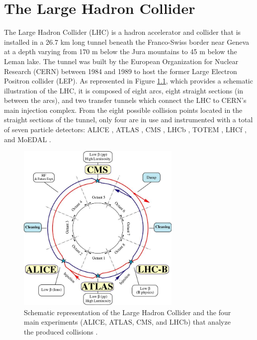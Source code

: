 \chapter{The Large Hadron Collider}
\label{chap:I-2-lhc}

	The Large Hadron Collider (LHC) \cite{Evans:2008zzb} is a hadron accelerator and collider that is installed in a 26.7 km long tunnel beneath the Franco-Swiss border near Geneva at a depth varying from 170 m below the Jura mountains to 45 m below the Leman lake. The tunnel was built by the European Organization for Nuclear Research (CERN) between 1984 and 1989 to host the former Large Electron Positron collider (LEP). As represented in Figure \ref{fig:I-2-lhc-schematic}, which provides a schematic illustration of the LHC, it is composed of eight arcs, eight straight sections (in between the arcs), and two transfer tunnels which connect the LHC to CERN's main injection complex. From the eight possible collision points located in the straight sections of the tunnel, only four are in use and instrumented with a total of seven particle detectors: ALICE \cite{1748-0221-3-08-S08002}, ATLAS \cite{1748-0221-3-08-S08003}, CMS \cite{1748-0221-3-08-S08004}, LHCb \cite{1748-0221-3-08-S08005}, TOTEM \cite{1748-0221-3-08-S08007}, LHCf \cite{1748-0221-3-08-S08006}, and MoEDAL \cite{Acharya:2014nyr}. \\

	\begin{figure}[b!]
		\centering
		\includegraphics[width=0.7\textwidth]{img/I-2-lhc/lhc.jpg}
		\caption{Schematic representation of the Large Hadron Collider and the four main experiments (ALICE, ATLAS, CMS, and LHCb) that analyze the produced collisions \cite{Evans:2008zzb}.}
		\label{fig:I-2-lhc-schematic}
	\end{figure}

